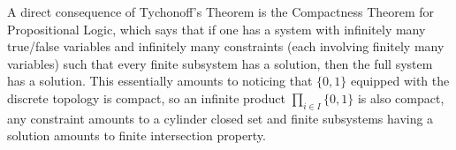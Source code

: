 \documentclass[12pt]{article}
\theoremstyle{bigskipthmstyle}
\theoremstyle{thmstyle}
\theoremstyle{plainstyle}
\begin{document}
A direct consequence of Tychonoff's Theorem is the Compactness Theorem for Propositional Logic,
which says that if one has a system with infinitely many true/false variables and infinitely many
constraints (each involving finitely many variables) such that every finite subsystem has a
solution, then the full system has a solution. This essentially amounts to noticing that $\{0,1\}$
equipped with the discrete topology is compact, so an infinite product $\prod_{i\in I}\{0,1\}$ is
also compact, any constraint amounts to a cylinder closed set and finite subsystems having a
solution amounts to finite intersection property.
\end{document}
